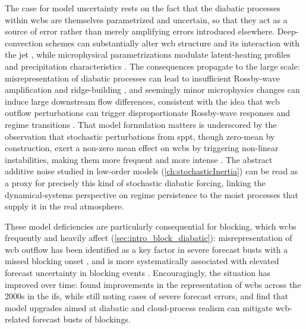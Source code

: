 The case for model uncertainty rests on the fact that the diabatic
processes within \glspl{wcb} are themselves parametrized and uncertain, so
that they act as a source of error rather than merely amplifying errors
introduced elsewhere. Deep-convection schemes can substantially alter
\gls{wcb} structure and its interaction with the jet
\parencite{riviereImpactDeepConvection2021}, while microphysical
parametrizations modulate latent-heating profiles and precipitation
characteristics \parencite{joosInfluenceMicrophysicalProcesses2012,
    mazoyerMicrophysicsImpactsWarm2021, mazoyerImpactMixedphaseCloud2023}. The
consequences propagate to the large scale: misrepresentation of diabatic
processes can lead to insufficient Rossby-wave amplification and
ridge-building \parencite{graySystematicModelForecast2014}, and seemingly
minor microphysics changes can induce large downstream flow differences,
consistent with the idea that \gls{wcb} outflow perturbations can trigger
disproportionate Rossby-wave responses and regime transitions
\parencite{joosImpactDifferentIFS2016}. That model formulation matters is
underscored by the observation that stochastic perturbations from \gls{sppt},
though zero-mean by construction, exert a non-zero mean effect on \glspl{wcb}
by triggering non-linear instabilities, making them more frequent and more
intense \parencite{picklEffectStochasticallyPerturbed2022}. The abstract
additive noise studied in low-order models
(\cref{ch:stochasticInertia}) can be read as a proxy for precisely this
kind of stochastic diabatic forcing, linking the dynamical-systems
perspective on regime persistence to the moist processes that supply it in
the real atmosphere.

These model deficiencies are particularly consequential for blocking, which
\glspl{wcb} frequently and heavily affect (\cref{sec:intro_block_diabatic}):
misrepresentation of \gls{wcb} outflow has been identified as a key factor
in severe forecast busts with a missed blocking onset
\parencite{gramsAtmosphericDynamicsPerspective2018}, and is more
systematically associated with elevated forecast uncertainty in blocking
events \parencite{wandelWhyMoistDynamic2024}. Encouragingly, the situation
has improved over time: \textcite{madonnaVerificationNorthAtlantic2015}
found improvements in the representation of \glspl{wcb} across the 2000s in
the \gls{ifs}, while still noting cases of severe forecast errors, and
\textcite{maddisonImpactModelUpgrades2020} find that model upgrades aimed at
diabatic and cloud-process realism can mitigate \gls{wcb}-related forecast
busts of blockings.

